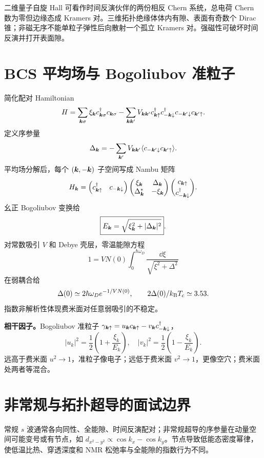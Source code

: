 二维量子自旋 Hall 可看作时间反演伙伴的两份相反 Chern 系统，总电荷 Chern 数为零但边缘态成 Kramers 对。三维拓扑绝缘体体内有隙、表面有奇数个 Dirac 锥；非磁无序不能单粒子弹性后向散射一个孤立 Kramers 对。强磁性可破坏时间反演并打开表面隙。

\section{BCS 平均场与 Bogoliubov 准粒子}
简化配对 Hamiltonian
\[
H=\sum_{\bm{k}\sigma}\xi_{\bm{k}}c_{\bm{k}\sigma}^\dagger c_{\bm{k}\sigma}
-\sum_{\bm{k}\bm{k}'}V_{\bm{k}\bm{k}'}
c_{\bm{k}\uparrow}^\dagger c_{-\bm{k}\downarrow}^\dagger
c_{-\bm{k}'\downarrow}c_{\bm{k}'\uparrow}.
\]
定义序参量
\[
\Delta_{\bm{k}}=-\sum_{\bm{k}'}V_{\bm{k}\bm{k}'}
\langle c_{-\bm{k}'\downarrow}c_{\bm{k}'\uparrow}\rangle.
\]
平均场分解后，每个 $(\bm{k},-\bm{k})$ 子空间写成 Nambu 矩阵
\[
H_{\bm{k}}=
\begin{pmatrix}c_{\bm{k}\uparrow}^\dagger&
c_{-\bm{k}\downarrow}\end{pmatrix}
\begin{pmatrix}\xi_{\bm{k}}&\Delta_{\bm{k}}\\
\Delta_{\bm{k}}^*&-\xi_{\bm{k}}\end{pmatrix}
\binom{c_{\bm{k}\uparrow}}{c_{-\bm{k}\downarrow}^\dagger}.
\]
幺正 Bogoliubov 变换给
\[
\boxed{E_{\bm{k}}=\sqrt{\xi_{\bm{k}}^2+|\Delta_{\bm{k}}|^2}}.
\]
对常数吸引 $V$ 和 Debye 壳层，零温能隙方程
\[
1=VN(0)\int_0^{\hbar\omega_D}
\frac{\dd\xi}{\sqrt{\xi^2+\Delta^2}}
\]
在弱耦合给
\[
\Delta(0)\simeq2\hbar\omega_D
e^{-1/VN(0)},\qquad
2\Delta(0)/k_{\mathrm B} T_c\simeq3.53.
\]
指数非解析性体现费米面对任意弱吸引的不稳定。

\begin{examplebox}
\textbf{相干因子。}Bogoliubov 准粒子
$\gamma_{\bm{k}\uparrow}=u_{\bm{k}}c_{\bm{k}\uparrow}
-v_{\bm{k}}c_{-\bm{k}\downarrow}^\dagger$，
\[
|u_k|^2=\frac12\left(1+\frac{\xi_k}{E_k}\right),\quad
|v_k|^2=\frac12\left(1-\frac{\xi_k}{E_k}\right).
\]
远高于费米面 $u^2\to1$，准粒子像电子；远低于费米面 $v^2\to1$，更像空穴；费米面处两者等混合。
\end{examplebox}

\section{非常规与拓扑超导的面试边界}
常规 $s$ 波通常各向同性、全能隙、时间反演配对；非常规超导的序参量在动量空间可能变号或有节点，如
$d_{x^2-y^2}\propto\cos k_x-\cos k_y$。节点导致低能态密度幂律，使低温比热、穿透深度和 NMR 松弛率与全能隙的指数行为不同。

